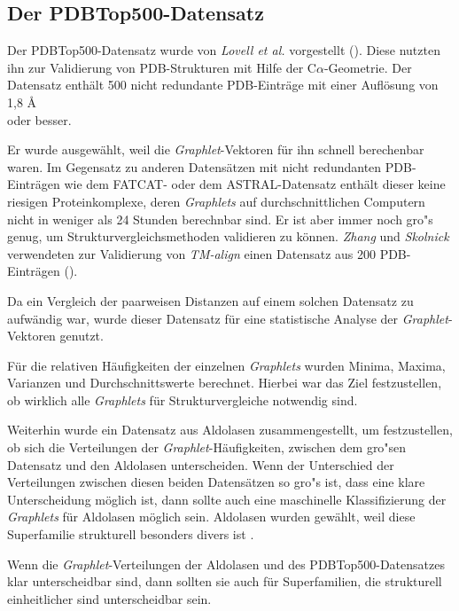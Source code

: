 \documentclass{report}
\begin{document}
\subsection{Der PDBTop500-Datensatz}

Der PDBTop500-Datensatz wurde von \textit{Lovell et al.} vorgestellt (\cite{top500}). Diese nutzten ihn zur Validierung von PDB-Strukturen mit Hilfe der C$\alpha$-Geometrie.
Der Datensatz enth\"alt 500 nicht redundante PDB-Eintr\"age mit einer Aufl\"osung von 1,8 \AA \\
oder besser.

Er wurde ausgew\"ahlt, weil die \textit{Graphlet}-Vektoren f\"ur ihn schnell berechenbar waren. Im Gegensatz zu anderen Datens\"atzen mit nicht redundanten PDB-Eintr\"agen wie dem FATCAT- oder dem ASTRAL-Datensatz enth\"alt dieser keine riesigen Proteinkomplexe, deren \textit{Graphlets} auf durchschnittlichen Computern nicht in weniger als 24 Stunden berechnbar sind. 
Er ist aber immer noch gro"s genug, um Strukturvergleichsmethoden validieren zu k\"onnen. \textit{Zhang} und \textit{Skolnick} verwendeten zur Validierung von \textit{TM-align} einen Datensatz aus 200 PDB-Eintr\"agen (\cite{zhangtm}).

Da ein Vergleich der paarweisen Distanzen auf einem solchen Datensatz zu aufw\"andig war, wurde dieser Datensatz f\"ur eine statistische Analyse der \textit{Graphlet}-Vektoren genutzt.

F\"ur die relativen H\"aufigkeiten der einzelnen \textit{Graphlets} wurden Minima, Maxima, Varianzen und Durchschnittswerte berechnet. Hierbei war das Ziel festzustellen, ob wirklich alle \textit{Graphlets} f\"ur Strukturvergleiche notwendig sind.

Weiterhin wurde ein Datensatz aus Aldolasen zusammengestellt, um festzustellen, ob sich die Verteilungen der \textit{Graphlet}-H\"aufigkeiten, zwischen dem gro"sen Datensatz und den Aldolasen unterscheiden. Wenn der Unterschied der Verteilungen zwischen diesen beiden Datens\"atzen so gro"s ist, dass eine klare Unterscheidung m\"oglich ist, dann sollte auch eine maschinelle Klassifizierung der \textit{Graphlets} f\"ur Aldolasen m\"oglich sein. Aldolasen wurden gew\"ahlt, weil diese Superfamilie strukturell besonders divers ist \cite{das2015diversity}.

Wenn die \textit{Graphlet}-Verteilungen der Aldolasen und des PDBTop500-Datensatzes klar unterscheidbar sind, dann sollten sie auch f\"ur Superfamilien, die strukturell einheitlicher sind unterscheidbar sein.
\end{document}
